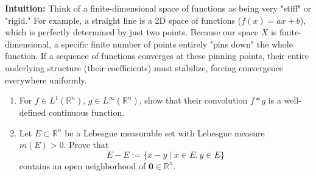 \begin{solution}
\textbf{Intuition:}
Think of a finite-dimensional space of functions as being very "stiff" or "rigid." For example, a straight line is a 2D space of functions ($f(x) = ax+b$), which is perfectly determined by just two points. Because our space $X$ is finite-dimensional, a specific finite number of points entirely "pins down" the whole function. If a sequence of functions converges at these pinning points, their entire underlying structure (their coefficients) must stabilize, forcing convergence everywhere uniformly.
\end{solution}

\begin{exercise}
\label{analysis:2021:3}
\begin{enumerate}
\item[(a)] For $f\in L^1(\mathbb{R}^n)$, $g\in L^{\infty}(\mathbb{R}^n)$, show that their convolution $f*g$ is a well-defined continuous function.
\item[(b)] Let $E\subset\mathbb{R}^n$ be a Lebesgue measurable set with Lebesgue measure $m(E)>0$. Prove that
\[
E-E := \{x-y\mid x\in E, y\in E\}
\]
contains an open neighborhood of $\mathbf{0}\in\mathbb{R}^n$.
\end{enumerate}
\end{exercise}

